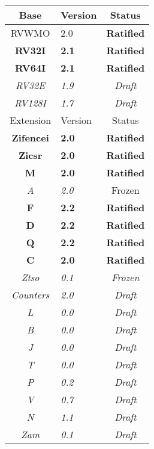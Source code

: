 {
\begin{table}[hbt]
  \centering
  \begin{tabular}{|c|l|c|}
    \hline
    Base           & Version & Status\\
    \hline
    RVWMO          & 2.0 & \bf Ratified   \\
    \bf RV32I      & \bf 2.1 & \bf Ratified \\
    \bf RV64I      & \bf 2.1 & \bf Ratified \\
    \em RV32E      & \em 1.9 & \em Draft \\
    \em RV128I     & \em 1.7 & \em Draft \\
    \hline
    Extension      & Version & Status \\
    \hline
    \bf Zifencei   & \bf 2.0 & \bf Ratified \\
    \bf Zicsr      & \bf 2.0 & \bf Ratified \\
    \bf M          & \bf 2.0 & \bf Ratified \\
    \em A          & \em 2.0 &  Frozen \\
    \bf F          & \bf 2.2 & \bf Ratified \\
    \bf D          & \bf 2.2 & \bf Ratified \\
    \bf Q          & \bf 2.2 & \bf Ratified \\
    \bf C          & \bf 2.0 & \bf Ratified \\
    \em Ztso       & \em 0.1 & \em Frozen \\
    \em Counters   & \em 2.0 & \em Draft \\
    \em L          & \em 0.0 & \em Draft \\
    \em B          & \em 0.0 & \em Draft \\
    \em J          & \em 0.0 & \em Draft \\
    \em T          & \em 0.0 & \em Draft \\
    \em P          & \em 0.2 & \em Draft \\
    \em V          & \em 0.7 & \em Draft \\
    \em N          & \em 1.1 & \em Draft \\
    \em Zam        & \em 0.1 & \em Draft \\
    \hline
  \end{tabular}
\end{table}
}

